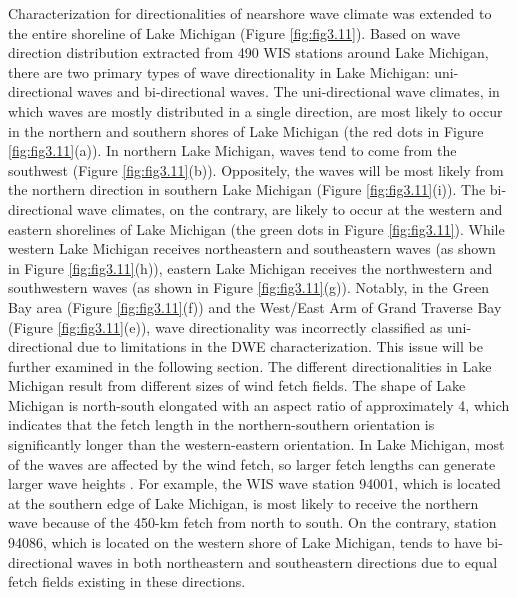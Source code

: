 Characterization for directionalities of nearshore wave climate was extended to the entire shoreline of Lake Michigan (Figure \ref{fig:fig3.11}). Based on wave direction distribution extracted from 490 WIS stations around Lake Michigan, there are two primary types of wave directionality in Lake Michigan: uni-directional waves and bi-directional waves. The uni-directional wave climates, in which waves are mostly distributed in a single direction, are most likely to occur in the northern and southern shores of Lake Michigan (the red dots in Figure \ref{fig:fig3.11}(a)). In northern Lake Michigan, waves tend to come from the southwest (\eg Figure \ref{fig:fig3.11}(b)). Oppositely, the waves will be most likely from the northern direction in southern Lake Michigan (\eg Figure \ref{fig:fig3.11}(i)). The bi-directional wave climates, on the contrary, are likely to occur at the western and eastern shorelines of Lake Michigan (the green dots in Figure \ref{fig:fig3.11}). While western Lake Michigan receives northeastern and southeastern waves (as shown in Figure \ref{fig:fig3.11}(h)), eastern Lake Michigan receives the northwestern and southwestern waves (as shown in Figure \ref{fig:fig3.11}(g)). Notably, in the Green Bay area (Figure \ref{fig:fig3.11}(f)) and the West/East Arm of Grand Traverse Bay (Figure \ref{fig:fig3.11}(e)), wave directionality was incorrectly classified as uni-directional due to limitations in the DWE characterization. This issue will be further examined in the following section. The different directionalities in Lake Michigan result from different sizes of wind fetch fields. The shape of Lake Michigan is north-south elongated with an aspect ratio of approximately 4, which indicates that the fetch length in the northern-southern orientation is significantly longer than the western-eastern orientation. In Lake Michigan, most of the waves are affected by the wind fetch, so larger fetch lengths can generate larger wave heights \citep{mason_effective_2018}. For example, the WIS wave station 94001, which is located at the southern edge of Lake Michigan, is most likely to receive the northern wave because of the 450-km fetch from north to south. On the contrary, station 94086, which is located on the western shore of Lake Michigan, tends to have bi-directional waves in both northeastern and southeastern directions due to equal fetch fields existing in these directions. 

